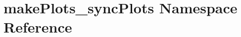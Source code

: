 \hypertarget{namespacemakePlots__syncPlots}{
\section{makePlots\_\-syncPlots Namespace Reference}
\label{namespacemakePlots__syncPlots}
}
